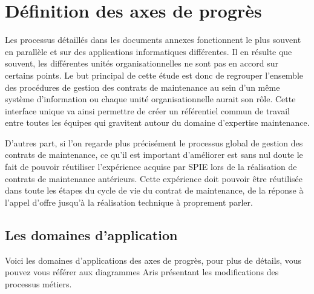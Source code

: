 \section{Définition des axes de progrès}

Les processus détaillés dans les documents annexes fonctionnent le plus souvent en parallèle et sur des applications informatiques différentes. Il en résulte que souvent, les différentes unités organisationnelles ne sont pas en accord sur certains points. Le but principal de cette étude est donc de regrouper l'ensemble des procédures de gestion des contrats de maintenance au sein d'un même système d'information ou chaque unité organisationnelle aurait son rôle. Cette interface unique va ainsi permettre de créer un référentiel commun de travail entre toutes les équipes qui gravitent autour du domaine d'expertise maintenance. 

D'autres part, si l'on regarde plus précisément le processus global de gestion des contrats de maintenance, ce qu'il est important d'améliorer est sans nul doute le fait de pouvoir réutiliser l'expérience acquise par SPIE lors de la réalisation de contrats de maintenance antérieurs. Cette expérience doit pouvoir être réutilisée dans toute les étapes du cycle de vie du contrat de maintenance, de la réponse à l'appel d'offre jusqu'à la réalisation technique à proprement parler.

\subsection {Les domaines d'application}

Voici les domaines d'applications des axes de progrès, pour plus de détails, vous pouvez vous référer aux diagrammes Aris présentant les modifications des processus métiers.

